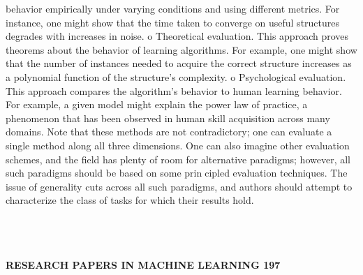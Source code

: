 \documentclass{article}
\begin{document}
behavior empirically under varying conditions and using different
metrics. For instance, one might show that the time taken to
converge on useful structures degrades with increases in noise.
o Theoretical evaluation. This approach proves theorems about the
behavior of learning algorithms. For example, one might show that
the number of instances needed to acquire the correct structure
increases as a polynomial function of the structure's complexity.
o Psychological evaluation. This approach compares the algorithm's
behavior to human learning behavior. For example, a given model
might explain the power law of practice, a phenomenon that has
been observed in human skill acquisition across many domains.
Note that these methods are not contradictory; one can evaluate a
single method along all three dimensions. One can also imagine other
evaluation schemes, and the field has plenty of room for alternative
paradigms; however, all such paradigms should be based on some principled evaluation techniques. The issue of generality cuts across all
such paradigms, and authors should attempt to characterize the class
of tasks for which their results hold.\\\\\\\\

\begin{small}
\textbf{RESEARCH PAPERS IN MACHINE LEARNING 197}
\end{small}\\
\end{document}
